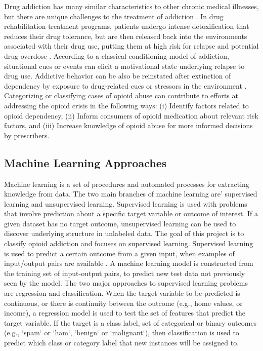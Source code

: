 \documentclass[sigconf]{acmart}
\begin{document}
Drug addiction has many similar characteristics to other chronic medical 
illnesses, but there are unique challenges to the treatment of addiction
\cite{marsch12, swendson16}. In drug rehabilitation treatment programs, 
patients undergo intense detoxification that reduces their drug tolerance, but 
are then released back into the environments associated with their drug use, 
putting them at high risk for relapse and potential drug overdose 
\cite{johnson11}. According to a classical conditioning model of addiction, 
situational cues or events can elicit a motivational state underlying relapse 
to drug use. Addictive behavior can be also be reinstated after extinction of 
dependency by exposure to drug-related cues or stressors in the environment 
\cite{shaham03}. Categorizing or classifying cases of opioid abuse can 
contribute to efforts at addressing the opioid crisis in the following ways: 
(i) Identify factors related to opioid dependency, (ii) Inform consumers of 
opioid medication about relevant risk factors, and (iii) Increase knowledge 
of opioid abuse for more informed decisions by prescribers. 

\subsection{Machine Learning Approaches} 

Machine learning is a set of procedures and automated processes for extracting 
knowledge from data. The two main branches of machine learning are' supervised 
learning and unsupervised learning. Supervised learning is used with problems 
that involve prediction about a specific target variable or outcome of interest. 
If a given dataset has no target outcome, unsupervised learning can be used to 
discover underlying structure in unlabeled data. The goal of this project is 
to classify opioid addiction and focuses on supervised learning. Supervised 
learning is used to predict a certain outcome from a given input, when examples 
of input/output pairs are available \cite{muller17}. A machine learning model 
is constructed from the training set of input-output pairs, to predict new test 
data not previously seen by the model. The two major approaches to supervised 
learning problems are regression and classification. When the target variable 
to be predicted is continuous, or there is continuity between the outcome (e.g., 
home values, or income), a regression model is used to test the set of features 
that predict the target variable. If the target is a class label, set of 
categorical or binary outcomes (e.g., `spam` or `ham`, `benign` or `malignant`), 
then classification is used to predict which class or category label that new 
instances will be assigned to.
\end{document}
